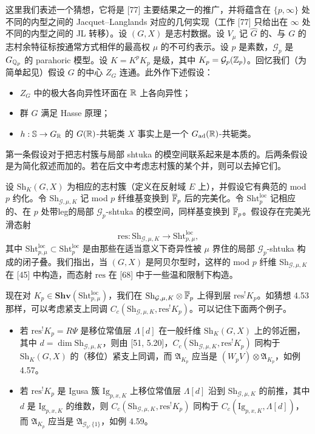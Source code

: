 这里我们表述一个猜想，它将是 [77] 主要结果之一的推广，并将蕴含在 $\{p,\infty\}$ 处不同的内型之间的 Jacquet–Langlands 对应的几何实现（工作 [77] 只给出在 $\infty$ 处不同的内型之间的 JL 转移）。设 $(G,X)$ 是志村数据。设 $V_\mu$ 记 $\hat G$ 的、与 $G$ 的志村余特征标按通常方式相伴的最高权 $\mu$ 的不可约表示。设 $p$ 是素数，$\mathcal G_p$ 是 $G_{\mathbb{Q}_p}$ 的 parahoric 模型。设 $K=K^pK_p$ 是级，其中 $K_p=\mathcal G_p(\mathbb{Z}_p)$。回忆我们（为简单起见）假设 $G$ 的中心 $Z_G$ 连通。此外作下述假设：
\begin{itemize}
\item $Z_G$ 中的极大各向异性环面在 $\mathbb{R}$ 上各向异性；
\item 群 $G$ 满足 Hasse 原理；
\item $h:\mathbb S\to G_{\mathbb{R}}$ 的 $G(\mathbb{R})$-共轭类 $X$ 事实上是一个 $G_{\mathrm{ad}}(\mathbb{R})$-共轭类。
\end{itemize}
第一条假设对于把志村簇与局部 shtuka 的模空间联系起来是本质的。后两条假设是为简化叙述而加的。若在后文中考虑志村簇的某个并，则可以去掉它们。

设 $\mathrm{Sh}_K(G,X)$ 为相应的志村簇（定义在反射域 $E$ 上），并假设它有典范的 mod $p$ 约化。令 $\mathrm{Sh}_{\mathcal G,\mu,K}$ 记 mod $p$ 纤维基变换到 $\overline{\mathbb{F}}_p$ 后的完美化。令 $\mathrm{Sht}^{\mathrm{loc}}_p$ 记相应的、在 $p$ 处带leg的局部 $\mathcal G_p$-shtuka 的模空间，同样基变换到 $\overline{\mathbb{F}}_p$。假设存在完美光滑态射
\[
\mathrm{res}:\mathrm{Sh}_{\mathcal G,\mu,K}\to\mathrm{Sht}^{\mathrm{loc}}_{p,\mu},
\]
其中 $\mathrm{Sht}^{\mathrm{loc}}_{p,\mu}\subset\mathrm{Sht}^{\mathrm{loc}}_p$ 是由那些在适当意义下奇异性被 $\mu$ 界住的局部 $\mathcal G_p$-shtuka 构成的闭子叠。我们指出，当 $(G,X)$ 是阿贝尔型时，这样的 mod $p$ 纤维 $\mathrm{Sh}_{\mathcal G,\mu,K}$ 在 [45] 中构造，而态射 $\mathrm{res}$ 在 [68] 中于一些温和限制下构造。

现在对 $K_p\in\mathbf{Shv}(\mathrm{Sht}^{\mathrm{loc}}_{p,\mu})$，我们在 $\mathrm{Sh}_{\mathcal G,\mu,K}\otimes\overline{\mathbb{F}}_p$ 上得到层 $\mathrm{res}^!K_p$。如猜想 4.53 那样，可以考虑紧支上同调 $C_c(\mathrm{Sh}_{\mathcal G,\mu,K},\mathrm{res}^!K_p)$。可以记住下面两个例子。
\begin{itemize}
\item 若 $\mathrm{res}^!K_p=R\Psi$ 是移位常值层 $\Lambda[d]$ 在一般纤维 $\mathrm{Sh}_K(G,X)$ 上的邻近圈，其中 $d=\dim\mathrm{Sh}_{\mathcal G,\mu,K}$，则由 [51, 5.20]，$C_c(\mathrm{Sh}_{\mathcal G,\mu,K},\mathrm{res}^!K_p)$ 同构于 $\mathrm{Sh}_K(G,X)$ 的（移位）紧支上同调，而 $\mathfrak A_{K_p}$ 应当是 $(W_pV)\otimes\mathfrak A_{K_p}$，如例 4.57。
\item 若 $\mathrm{res}^!K_p$ 是 Igusa 簇 $\mathrm{Ig}_{p,x,K}$ 上移位常值层 $\Lambda[d]$ 沿到 $\mathrm{Sh}_{\mathcal G,\mu,K}$ 的前推，其中 $d$ 是 $\mathrm{Ig}_{p,x,K}$ 的维数，则 $C_c(\mathrm{Sh}_{\mathcal G,\mu,K},\mathrm{res}^!K_p)$ 同构于 $C_c(\mathrm{Ig}_{p,x,K},\Lambda[d])$，而 $\mathfrak A_{K_p}$ 应当是 $\mathfrak A_{\mathcal G_b,\{1\}}$，如例 4.59。
\end{itemize}

